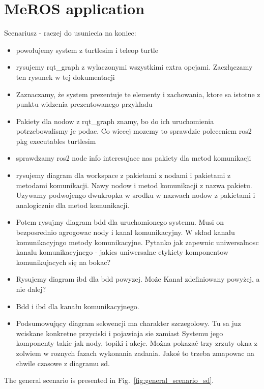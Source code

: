 \documentclass[11pt,oneside,a4paper]{report}
\begin{document}
\chapter{MeROS application}
\label{ch:application}
Scenariusz - raczej do usuniecia na koniec:
\begin{itemize}
	\item powołujemy system z turtlesim i teleop turtle
	\item rysujemy rqt\_graph z wylaczonymi wszystkimi extra opcjami. Zaczłączamy ten rysunek w tej dokumentacji
	\item Zaznaczamy, że system prezentuje te elementy i zachowania, ktore sa istotne z punktu widzenia prezentowanego przykladu
	\item Pakiety dla nodow z rqt\_graph  znamy, bo do ich uruchomienia potrzebowalismy je podac. Co wiecej mozemy to sprawdzic poleceniem ros2 pkg executables turtlesim
	\item sprawdzamy ros2 node info interesujace nas pakiety dla metod komunikacji
	\item rysujemy diagram dla workspace z pakietami z nodami i pakietami z metodami komunikacji. Nawy nodow i metod komunikacji z nazwa pakietu. Uzywamy podwojengo dwukropka w srodku w nazwach nodow z pakietami i analogicznie dla metod komunikacji.
	\item Potem rysujmy diagram bdd dla uruchomionego systemu. Musi on bezposrednio agrogowac nody i kanal komunikacyjny. W skład kanału komunikacyjngo metody komunikacyjne. Pytanko jak zapewnic uniwersalnosc kanalu komunikacyjnego - jakies uniwersalne etykiety komponentow komunikujacych się na bokac?
	\item Rysujemy diagram ibd dla bdd powyzej. Może Kanał zdefiniowany powyżej, a nie dalej?
	\item Bdd i ibd dla kanału komunikacyjnego.
	\item Podsumowujący diagram sekwencji ma charakter szczegolowy. Tu sa juz wciskane konkretne przyciski i pojawiaja sie zamiast Systemu jego komponenty takie jak nody, topiki i akcje. Można pokazać trzy zrzuty okna z zolwiem w roznych fazach wykonania zadania. Jakoś to trzeba zmapowac na chwile czasowe z diagramu sd.
\end{itemize}


\pagebreak



The general scenario is presented in Fig.~\ref{fig:general_scenario_sd}.
\end{document}
